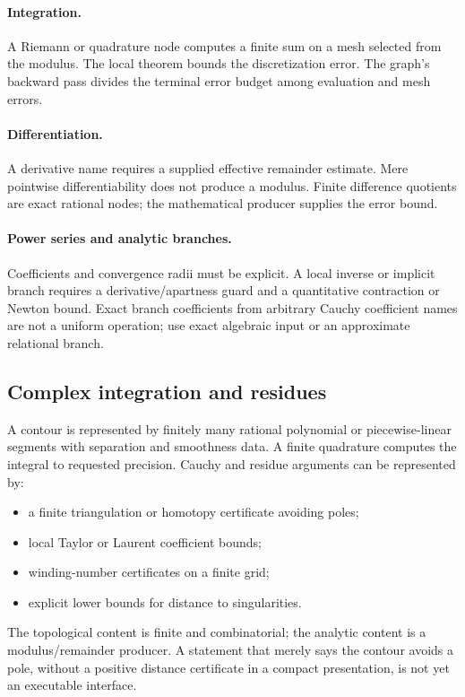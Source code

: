 \paragraph{Integration.}
A Riemann or quadrature node computes a finite sum on a mesh selected from the modulus.  The local theorem bounds the discretization error.  The graph's backward pass divides the terminal error budget among evaluation and mesh errors.

\paragraph{Differentiation.}
A derivative name requires a supplied effective remainder estimate.  Mere pointwise differentiability does not produce a modulus.  Finite difference quotients are exact rational nodes; the mathematical producer supplies the error bound.

\paragraph{Power series and analytic branches.}
Coefficients and convergence radii must be explicit.  A local inverse or implicit branch requires a derivative/apartness guard and a quantitative contraction or Newton bound.  Exact branch coefficients from arbitrary Cauchy coefficient names are not a uniform operation; use exact algebraic input or an approximate relational branch.

\subsection{Complex integration and residues}

A contour is represented by finitely many rational polynomial or piecewise-linear segments with separation and smoothness data.  A finite quadrature computes the integral to requested precision.  Cauchy and residue arguments can be represented by:

\begin{itemize}
\item a finite triangulation or homotopy certificate avoiding poles;
\item local Taylor or Laurent coefficient bounds;
\item winding-number certificates on a finite grid;
\item explicit lower bounds for distance to singularities.
\end{itemize}

The topological content is finite and combinatorial; the analytic content is a modulus/remainder producer.  A statement that merely says the contour avoids a pole, without a positive distance certificate in a compact presentation, is not yet an executable interface.


